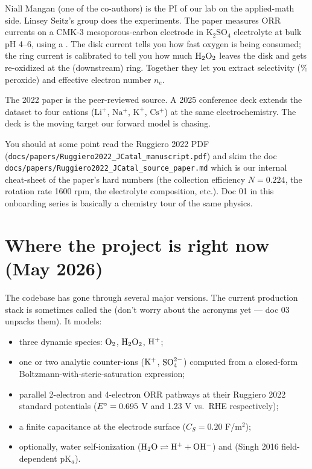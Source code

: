 \documentclass[11pt]{article}
\begin{document}
Niall Mangan (one of the co-authors) is the PI of our lab on the
applied-math side. Linsey Seitz's group does the experiments. The
paper measures ORR currents on a CMK-3 mesoporous-carbon electrode
in $\mathrm{K_2SO_4}$ electrolyte at bulk pH 4--6, using a
. The disk current
tells you how fast oxygen is being consumed; the ring current is
calibrated to tell you how much $\mathrm{H_2O_2}$ leaves the disk and gets
re-oxidized at the (downstream) ring. Together they let you extract
selectivity (\% peroxide) and effective electron number $n_e$.

The 2022 paper is the peer-reviewed source. A 2025 conference deck
extends the dataset to four cations ($\mathrm{Li^+}$,
$\mathrm{Na^+}$, $\mathrm{K^+}$, $\mathrm{Cs^+}$) at the same
electrochemistry. The deck is the moving target our forward model is
chasing.

You should at some point read the Ruggiero 2022 PDF
(\texttt{docs/papers/Ruggiero2022\_JCatal\_manuscript.pdf}) and skim
the doc \texttt{docs/papers/Ruggiero2022\_JCatal\_source\_paper.md}
which is our internal cheat-sheet of the paper's hard numbers (the
collection efficiency $N=0.224$, the rotation rate 1600 rpm, the
electrolyte composition, etc.). Doc 01 in this onboarding series is
basically a chemistry tour of the same physics.

\section{Where the project is right now (May 2026)}

The codebase has gone through several major versions. The current
production stack is sometimes called the
 (don't worry about the
acronyms yet --- doc 03 unpacks them). It models:

\begin{itemize}[leftmargin=*]
  \item three dynamic species: $\mathrm{O_2}$, $\mathrm{H_2O_2}$, $\mathrm{H^+}$;
  \item one or two analytic counter-ions ($\mathrm{K^+}$, $\mathrm{SO_4^{2-}}$) computed
        from a closed-form Boltzmann-with-steric-saturation expression;
  \item parallel 2-electron and 4-electron ORR pathways at their
        Ruggiero 2022 standard potentials ($E^{\circ} = 0.695$ V and 1.23 V
        vs.\ RHE respectively);
  \item a finite  capacitance at the
        electrode surface ($C_S = 0.20$ F/m$^2$);
  \item optionally, water self-ionization ($\mathrm{H_2O} \rightleftharpoons
        \mathrm{H^+} + \mathrm{OH^-}$) and 
        (Singh 2016 field-dependent pK$_a$).
\end{itemize}
\end{document}
